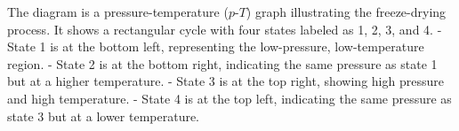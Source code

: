 The diagram is a pressure-temperature (\(p\)-\(T\)) graph illustrating the freeze-drying process. It shows a rectangular cycle with four states labeled as 1, 2, 3, and 4.  
- State 1 is at the bottom left, representing the low-pressure, low-temperature region.  
- State 2 is at the bottom right, indicating the same pressure as state 1 but at a higher temperature.  
- State 3 is at the top right, showing high pressure and high temperature.  
- State 4 is at the top left, indicating the same pressure as state 3 but at a lower temperature.